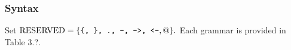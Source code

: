 \subsubsection*{Syntax}
Set $\mathrm{RESERVED} = \{\texttt{\{, \}, ., -, ->, <-}, @\}.$ Each grammar is provided in Table 3.?.


